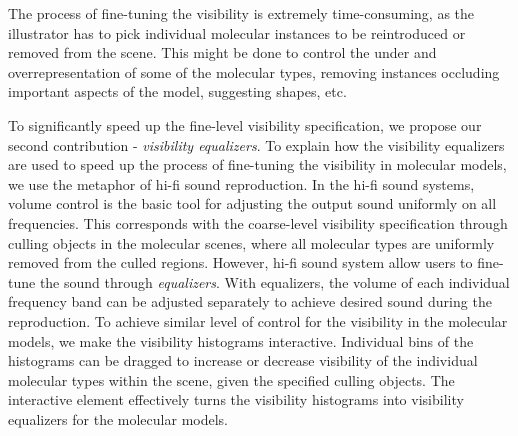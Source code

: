The process of fine-tuning the visibility is extremely time-consuming, as the illustrator has to pick individual molecular instances to be reintroduced or removed from the scene.
This might be done to control the under and overrepresentation of some of the molecular types, removing instances occluding important aspects of the model, suggesting shapes, etc.

To significantly speed up the fine-level visibility specification, we propose our second contribution - \emph{visibility equalizers}.
To explain how the visibility equalizers are used to speed up the process of fine-tuning the visibility in molecular models, we use the metaphor of hi-fi sound reproduction.
In the hi-fi sound systems, volume control is the basic tool for adjusting the output sound uniformly on all frequencies.
This corresponds with the coarse-level visibility specification through culling objects in the molecular scenes, where all molecular types are uniformly removed from the culled regions.
However, hi-fi sound system allow users to fine-tune the sound through \emph{equalizers}.
With equalizers, the volume of each individual frequency band can be adjusted separately to achieve desired sound during the reproduction.
To achieve similar level of control for the visibility in the molecular models, we make the visibility histograms interactive.
Individual bins of the histograms can be dragged to increase or decrease visibility of the individual molecular types within the scene, given the specified culling objects.
The interactive element effectively turns the visibility histograms into visibility equalizers for the molecular models.





